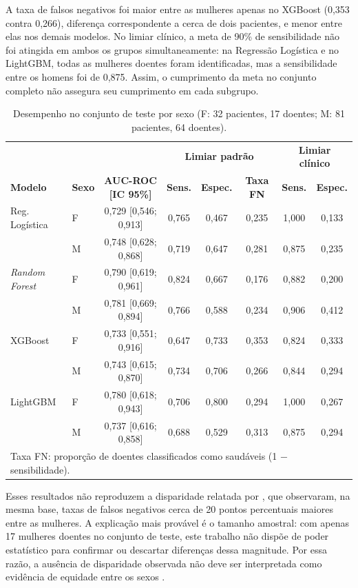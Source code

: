 A taxa de falsos negativos foi maior entre as mulheres apenas no XGBoost (0,353 contra 0,266), diferença correspondente a cerca de dois pacientes, e menor entre elas nos demais modelos. No limiar clínico, a meta de 90\% de sensibilidade não foi atingida em ambos os grupos simultaneamente: na Regressão Logística e no LightGBM, todas as mulheres doentes foram identificadas, mas a sensibilidade entre os homens foi de 0,875. Assim, o cumprimento da meta no conjunto completo não assegura seu cumprimento em cada subgrupo.

\begin{table}[htbp]
\centering
\small
\begin{tabular}{llcccccc}
\hline
 & & & \multicolumn{3}{c}{\textbf{Limiar padrão}} & \multicolumn{2}{c}{\textbf{Limiar clínico}} \\
\textbf{Modelo} & \textbf{Sexo} & \textbf{AUC-ROC [IC 95\%]} & \textbf{Sens.} & \textbf{Espec.} & \textbf{Taxa FN} & \textbf{Sens.} & \textbf{Espec.} \\
\hline
Reg. Logística         & F & 0,729 [0,546; 0,913] & 0,765 & 0,467 & 0,235 & 1,000 & 0,133 \\
                       & M & 0,748 [0,628; 0,868] & 0,719 & 0,647 & 0,281 & 0,875 & 0,235 \\
\textit{Random Forest} & F & 0,790 [0,619; 0,961] & 0,824 & 0,667 & 0,176 & 0,882 & 0,200 \\
                       & M & 0,781 [0,669; 0,894] & 0,766 & 0,588 & 0,234 & 0,906 & 0,412 \\
XGBoost                & F & 0,733 [0,551; 0,916] & 0,647 & 0,733 & 0,353 & 0,824 & 0,333 \\
                       & M & 0,743 [0,615; 0,870] & 0,734 & 0,706 & 0,266 & 0,844 & 0,294 \\
LightGBM               & F & 0,780 [0,618; 0,943] & 0,706 & 0,800 & 0,294 & 1,000 & 0,267 \\
                       & M & 0,737 [0,616; 0,858] & 0,688 & 0,529 & 0,313 & 0,875 & 0,294 \\
\hline
\multicolumn{8}{l}{\footnotesize Taxa FN: proporção de doentes classificados como saudáveis (1 $-$ sensibilidade).} \\
\end{tabular}
\caption{Desempenho no conjunto de teste por sexo (F: 32 pacientes, 17 doentes; M: 81 pacientes, 64 doentes).}
\label{tab:res_sexo}
\end{table}

Esses resultados não reproduzem a disparidade relatada por , que observaram, na mesma base, taxas de falsos negativos cerca de 20 pontos percentuais maiores entre as mulheres. A explicação mais provável é o tamanho amostral: com apenas 17 mulheres doentes no conjunto de teste, este trabalho não dispõe de poder estatístico para confirmar ou descartar diferenças dessa magnitude. Por essa razão, a ausência de disparidade observada não deve ser interpretada como evidência de equidade entre os sexos \cite{Rajkomar2018Ensuring}.


